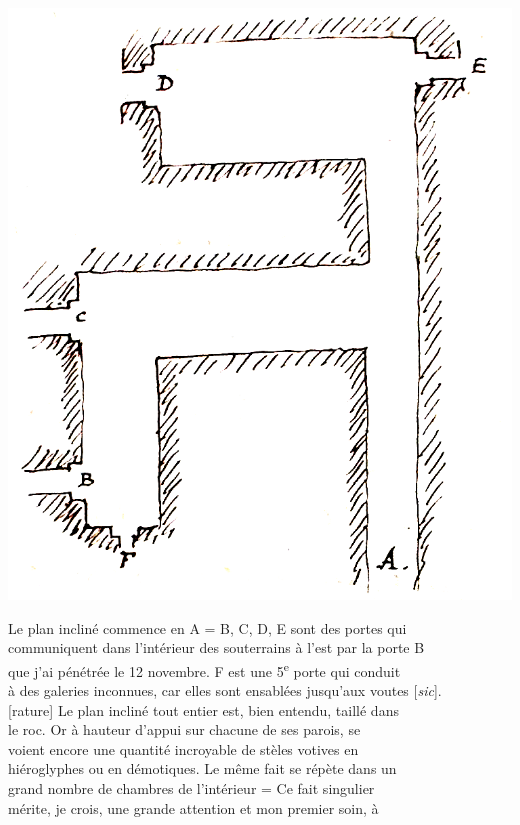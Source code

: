 \documentclass{book}
\begin{document}
\begin{center}
\includegraphics{CoEg_Mariette_1852-01-16_fig-1.png}
\end{center}
\indent Le plan incliné commence en A = B, C, D, E sont des portes qui\\
communiquent dans l’intérieur des souterrains à l’est par la porte B\\
que j’ai pénétrée le 12 novembre. F est une 5\textsuperscript{e} porte qui conduit\\
à des galeries inconnues, car elles sont ensablées jusqu’aux voutes [\textit{sic}].\\
{[rature]} Le plan incliné tout entier est, bien entendu, taillé dans\\
le roc. Or à hauteur d’appui sur chacune de ses parois, se\\
voient encore une quantité incroyable de stèles votives en\\
hiéroglyphes ou en démotiques. Le même fait se répète dans un\\
grand nombre de chambres de l’intérieur = Ce fait singulier\\
mérite, je crois, une grande attention et mon premier soin, à\\
\end{document}
